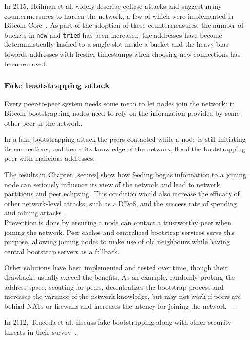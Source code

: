 \documentclass[12pt, letterpaper, twoside]{article}
\begin{document}
In 2015, Heilman et al. widely describe eclipse attacks and suggest many countermeasures to harden the network, a few of which were implemented in Bitcoin Core~\cite{eclipseatk}. As part of the adoption of these countermeasures, the number of buckets in \texttt{new} and \texttt{tried} has been increased, the addresses have become deterministically hashed to a single slot inside a bucket and the heavy bias towards addresses with fresher timestamps when choosing new connections has been removed.


\subsubsection{Fake bootstrapping attack}\label{sec:fakeboot}
Every peer-to-peer system needs some mean to let nodes join the network: in Bitcoin bootstrapping nodes need to rely on the information provided by some other peer in the network.

In a fake bootstrapping attack the peers contacted while a node is still initiating its connections, and hence its knowledge of the network, flood the bootstrapping peer with malicious addresses.

The results in Chapter~\ref{sec:res} show how feeding bogus information to a joining node can seriously influence its view of the network and lead to network partitions and peer eclipsing. This condition would also increase the efficacy of other network-level attacks, such as a DDoS, and the success rate of spending and mining attacks~\cite{eclipseatk}.\\

Prevention is done by ensuring a node can contact a trustworthy peer when joining the network. Peer caches and centralized bootstrap services serve this purpose, allowing joining nodes to make use of old neighbours while having central bootstrap servers as a fallback.

Other solutions have been implemented and tested over time, though their drawbacks usually exceed the benefits. As an example, randomly probing the address space, scouting for peers, decentralizes the bootstrap process and increases the variance of the network knowledge, but may not work if peers are behind NATs or firewalls and increases the latency for joining the network~\cite{decentrbootstrapp2p}~\cite{localityaware}.

In 2012,  Touceda et al. discuss fake bootstrapping along with other security threats in their survey~\cite{toucedafakeboot}.
\end{document}
